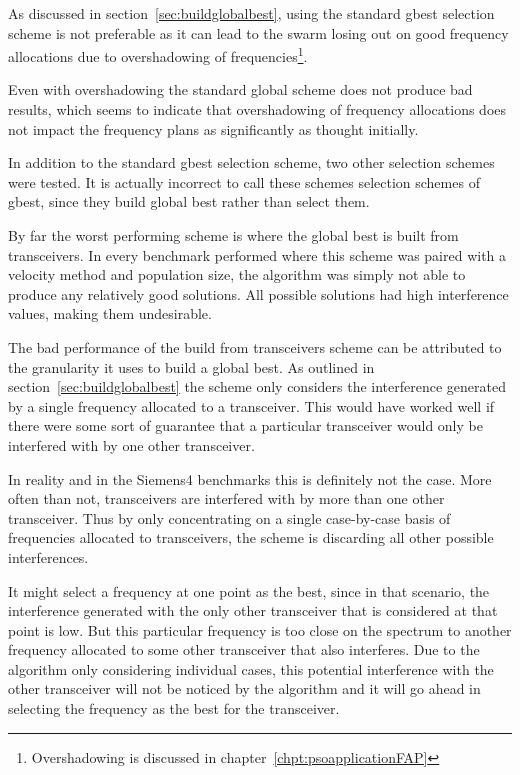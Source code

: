 As discussed in section~\ref{sec:buildglobalbest}, using the standard gbest selection scheme is not preferable as it can lead to the swarm losing out on good frequency allocations due to overshadowing of frequencies\footnote{Overshadowing is discussed in chapter~\ref{chpt:psoapplicationFAP}}.

Even with overshadowing the standard global scheme does not produce bad results, which seems to indicate that overshadowing of frequency allocations does not impact the frequency plans as significantly as thought initially.

In addition to the standard gbest selection scheme, two other selection schemes were tested. It is actually incorrect to call these schemes selection schemes of gbest, since they build global best rather than select them.

By far the worst performing scheme is where the global best is built from transceivers. In every benchmark performed where this scheme was paired with a velocity method and population size, the algorithm was simply not able to produce any relatively good solutions. All possible solutions had high interference values, making them undesirable.

The bad performance of the build from transceivers scheme can be attributed to the granularity it uses to build a global best. As outlined in section~\ref{sec:buildglobalbest} the scheme only considers the interference generated by a single frequency allocated to a transceiver. This would have worked well if there were some sort of guarantee that a particular transceiver would only be interfered with by one other transceiver.

In reality and in the Siemens4 benchmarks this is definitely not the case. More often than not, transceivers are interfered with by more than one other transceiver. Thus by only concentrating on a single case-by-case basis of frequencies allocated to transceivers, the scheme is discarding all other possible interferences. 

It might select a frequency at one point as the best, since in that scenario, the interference generated with the only other transceiver that is considered at that point is low. But this particular frequency is too close on the spectrum to another frequency allocated to some other transceiver that also interferes. Due to the algorithm only considering individual cases, this potential interference with the other transceiver will not be noticed by the algorithm and it will go ahead in selecting the frequency as the best for the transceiver.

